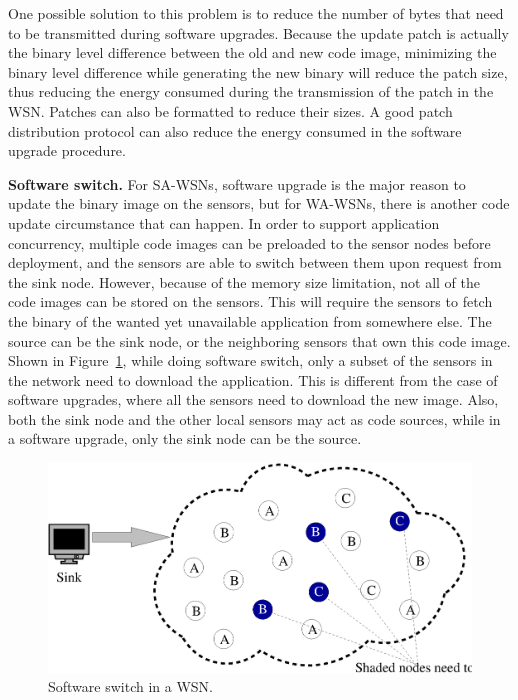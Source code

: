 One possible solution to this problem is to reduce the number of bytes that need to be transmitted during software 
upgrades. Because the update patch is actually the binary level difference between the old and new code image, 
minimizing the binary level difference while generating the new binary will reduce the patch size, thus reducing the 
energy consumed during the transmission of the patch in the WSN. Patches can also be formatted to reduce their sizes.
A good patch distribution protocol can also reduce the energy consumed in the software upgrade procedure.


\textbf{Software switch.}
For SA-WSNs, software upgrade is the major reason to update the binary image on the sensors, but for WA-WSNs, there is 
another code update circumstance that can happen.
In order to support application concurrency, multiple code images can be preloaded to the sensor nodes before 
deployment, and the sensors are able to switch between them upon request from the sink node. However, because of the 
memory size limitation, not all of the code images can be stored on the sensors. This will require the sensors to fetch 
the binary of the wanted yet unavailable application from somewhere else. The source can be the sink node, or the 
neighboring sensors that own this code image. Shown in Figure~\ref{fig:switch}, while doing software switch, only a 
subset of the sensors in the network need to download the application.
This is different from the case of software upgrades, where all the sensors need to download the new image. Also, both 
the sink node and the other local sensors may act as code sources, while in a software upgrade, only the sink node can 
be the source.
\begin{figure}[htbp]
	\centering
		\includegraphics[scale=0.45]{figures/switch.eps}
	\caption{Software switch in a WSN.}
	\label{fig:switch}
\end{figure}

